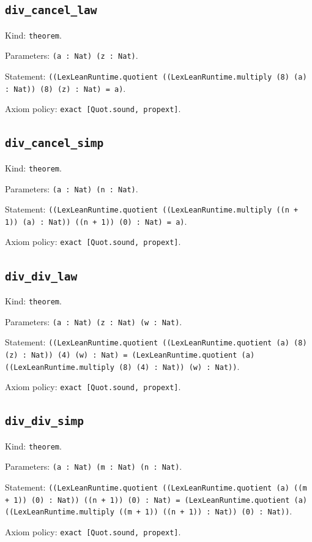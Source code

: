 \documentclass[11pt]{article}
\begin{document}
\subsection*{\texttt{div\_cancel\_law}}
\noindent Kind: \texttt{theorem}.\par
\noindent Parameters: \texttt{(a : Nat) (z : Nat)}.\par
\noindent Statement: \texttt{((LexLeanRuntime.quotient ((LexLeanRuntime.multiply (8) (a) : Nat)) (8) (z) : Nat) = a)}.\par
\noindent Axiom policy: \texttt{exact [Quot.sound, propext]}.\par
\subsection*{\texttt{div\_cancel\_simp}}
\noindent Kind: \texttt{theorem}.\par
\noindent Parameters: \texttt{(a : Nat) (n : Nat)}.\par
\noindent Statement: \texttt{((LexLeanRuntime.quotient ((LexLeanRuntime.multiply ((n + 1)) (a) : Nat)) ((n + 1)) (0) : Nat) = a)}.\par
\noindent Axiom policy: \texttt{exact [Quot.sound, propext]}.\par
\subsection*{\texttt{div\_div\_law}}
\noindent Kind: \texttt{theorem}.\par
\noindent Parameters: \texttt{(a : Nat) (z : Nat) (w : Nat)}.\par
\noindent Statement: \texttt{((LexLeanRuntime.quotient ((LexLeanRuntime.quotient (a) (8) (z) : Nat)) (4) (w) : Nat) = (LexLeanRuntime.quotient (a) ((LexLeanRuntime.multiply (8) (4) : Nat)) (w) : Nat))}.\par
\noindent Axiom policy: \texttt{exact [Quot.sound, propext]}.\par
\subsection*{\texttt{div\_div\_simp}}
\noindent Kind: \texttt{theorem}.\par
\noindent Parameters: \texttt{(a : Nat) (m : Nat) (n : Nat)}.\par
\noindent Statement: \texttt{((LexLeanRuntime.quotient ((LexLeanRuntime.quotient (a) ((m + 1)) (0) : Nat)) ((n + 1)) (0) : Nat) = (LexLeanRuntime.quotient (a) ((LexLeanRuntime.multiply ((m + 1)) ((n + 1)) : Nat)) (0) : Nat))}.\par
\noindent Axiom policy: \texttt{exact [Quot.sound, propext]}.\par
\end{document}
